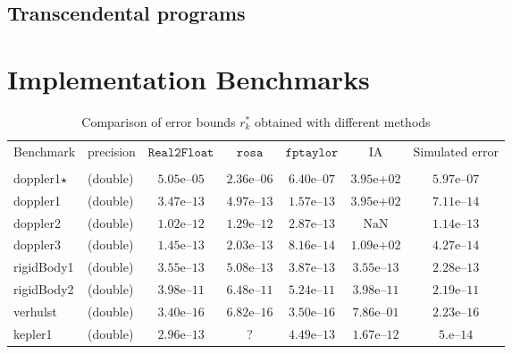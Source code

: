 \documentclass[a4paper,10pt]{article}
\newcommand{\nan}{\text{NaN}}
\newcommand{\realtofloat}{\mathtt{Real2Float}}
\newcommand{\rosa}{\mathtt{rosa}}
\newcommand{\fptaylor}{\mathtt{fptaylor}}
\theoremstyle{plain}
\theoremstyle{definition}
\theoremstyle{remark}
\begin{document}
\subsection{Transcendental programs}

\section{Implementation Benchmarks} %
\label{sec:benchs}
\begin{table}[!ht]
\begin{center}
\caption{Comparison of error bounds $r_k^*$ obtained with different methods}
\begin{tabular}{p{2.3cm}lccccc}
\hline
\multirow{2}{*}{Benchmark} & \multirow{2}{*}{precision} & \multirow{2}{*}{$\realtofloat$} & $\rosa$  & $\fptaylor$  &\multirow{2}{*}{IA} & \multirow{2}{*}{Simulated error}
\\
& & & \cite{Darulova14Popl} & \cite{fptaylor15} & & \\
\hline            
\multirow{1}{*}{doppler1$\star$}
& (double) & $5.05\text{e--}05$ & $2.36\text{e--}06$ & $6.40\text{e--}07$ & $3.95\text{e+}02$ & $5.97\text{e--}07$\\
\multirow{1}{*}{doppler1}
& (double) & $3.47\text{e--}13$ & $4.97\text{e--}13$ & $1.57\text{e--}13$ & $3.95\text{e+}02$ & $7.11\text{e--}14$\\
\multirow{1}{*}{doppler2}
& (double) & $1.02\text{e--}12$ & $1.29\text{e--}12$ & $2.87\text{e--}13$ & $\nan$ & $1.14\text{e--}13$\\
\multirow{1}{*}{doppler3}
& (double) & $1.45\text{e--}13$ & $2.03\text{e--}13$ & $8.16\text{e--}14$ & $1.09\text{e+}02$ & $4.27\text{e--}14$\\
\multirow{1}{*}{rigidBody1}
& (double) & $3.55\text{e--}13$ & $5.08\text{e--}13$ & $3.87\text{e--}13$ & $3.55\text{e--}13$ & $2.28\text{e--}13$\\
\multirow{1}{*}{rigidBody2}
& (double) & $3.98\text{e--}11$ & $6.48\text{e--}11$ & $5.24\text{e--}11$ & $3.98\text{e--}11$ & $2.19\text{e--}11$\\
\multirow{1}{*}{verhulst}
& (double) & $3.40\text{e--}16$ & $6.82\text{e--}16$ & $3.50\text{e--}16$ & $7.86\text{e--}01$ & $2.23\text{e--}16$\\
\multirow{1}{*}{kepler1}
& (double) & $2.96\text{e--}13$ & ? & $4.49\text{e--}13$ & $1.67\text{e--}12$ & $5.\text{e--}14$\\

\end{tabular}
\end{center}
\end{table}
\end{document}
